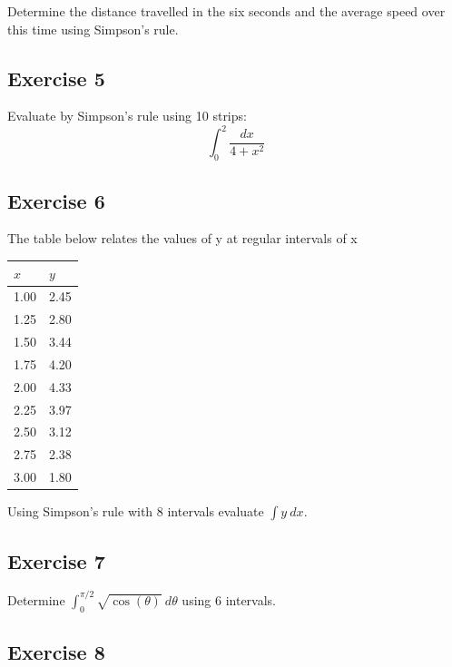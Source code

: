 \documentclass[
  english,
  11pt,
  oneside]{book}
\newcommand{\slide}{}
\theoremstyle{definition}
\theoremstyle{definition}
\theoremstyle{definition}
\theoremstyle{definition}
\theoremstyle{remark}
\begin{document}
Determine the distance travelled in the six seconds and the average speed over this time using
Simpson's rule.

\slide

\subsection*{Exercise 5}\label{exercise-5-3}

Evaluate by Simpson's rule using 10 strips:
\[\int_0^2\frac{dx}{4+x^2}\]

\slide

\subsection*{Exercise 6}\label{exercise-6-3}

The table below relates the values of y at regular intervals of x

\begin{tabular}{l|l}
\hline
$x$ & $y$\\
\hline
1.00 & 2.45\\
\hline
1.25 & 2.80\\
\hline
1.50 & 3.44\\
\hline
1.75 & 4.20\\
\hline
2.00 & 4.33\\
\hline
2.25 & 3.97\\
\hline
2.50 & 3.12\\
\hline
2.75 & 2.38\\
\hline
3.00 & 1.80\\
\hline
\end{tabular}

Using Simpson's rule with 8 intervals evaluate \(\displaystyle\int y\ dx\).

\slide

\subsection*{Exercise 7}\label{exercise-7-1}

Determine \(\displaystyle\int_0^{\pi/2}\sqrt{\cos(\theta)}\ d\theta\) using 6 intervals.

\slide

\subsection*{Exercise 8}\label{exercise-8}
\end{document}
